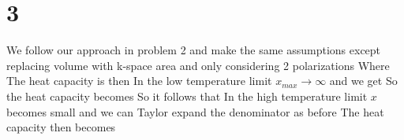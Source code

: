 \section*{3}
We follow our approach in problem 2 and make the same assumptions except replacing volume with k-space area and only considering 2 polarizations
Where
The heat capacity is then
In the low temperature limit $x_{max}\rightarrow \infty$ and we get
So the heat capacity becomes
So it follows that
In the high temperature limit $x$ becomes small and we can Taylor expand the denominator as before
The heat capacity then becomes
\pagebreak
